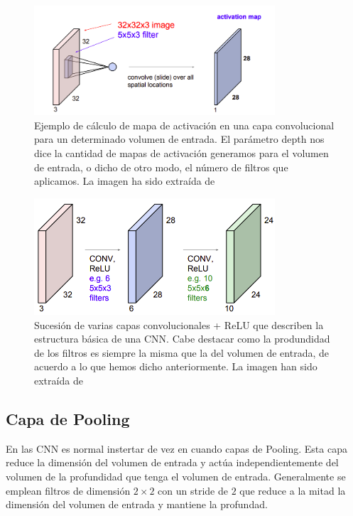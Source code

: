             \begin{figure}[!h]
                \centering
                \includegraphics[width=0.8\textwidth]{img/mapa_activacion.png}
                \caption{Ejemplo de cálculo de mapa de activación en una capa convolucional para un determinado volumen de entrada. El parámetro depth nos dice la cantidad de mapas de activación generamos para el volumen de entrada, o dicho de otro modo, el número de filtros que aplicamos. La imagen ha sido extraída de \cite{StanfordCourse}}
                \label{fig:mapa_activacion}
            \end{figure}

            \begin{figure}[!h]
                \centering
                \includegraphics[width=0.8\textwidth]{img/sucesion_conv_layer.png}
                \caption{Sucesión de varias capas convolucionales + ReLU que describen la estructura básica de una CNN. Cabe destacar como la produndidad de los filtros es siempre la misma que la del volumen de entrada, de acuerdo a lo que hemos dicho anteriormente. La imagen han sido extraída de \cite{StanfordCourse}}
                \label{fig:estructura_convnet}
            \end{figure}

        \subsection{Capa de Pooling}
            \noindent En las CNN es normal instertar de vez en cuando capas de Pooling. Esta capa reduce la dimensión del volumen de entrada y actúa independientemente del volumen de la profundidad que tenga el volumen de entrada. Generalmente se emplean filtros de dimensión $2 \times 2$ con un stride de $2$ que reduce a la mitad la dimensión del volumen de entrada y mantiene la profundad.

